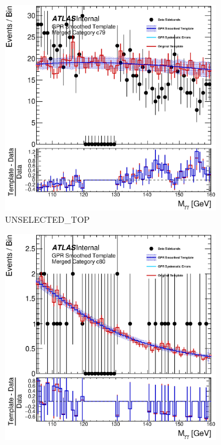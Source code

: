 \begin{figure}
\begin{center}
\begin{subfigure}[T]{0.49\linewidth}
	\includegraphics[width=\linewidth]{figures/background/gpr/coupCatTemplates/GPR_Smoothed_Plot_hmgg_c79.eps}
	\caption{UNSELECTED\_TOP}
\end{subfigure}
\begin{subfigure}[T]{0.49\linewidth}
	\centering
	\includegraphics[width=\linewidth]{figures/background/gpr/coupCatTemplates/GPR_Smoothed_Plot_hmgg_c80.eps}

\end{subfigure}
\end{center}
\end{figure}
